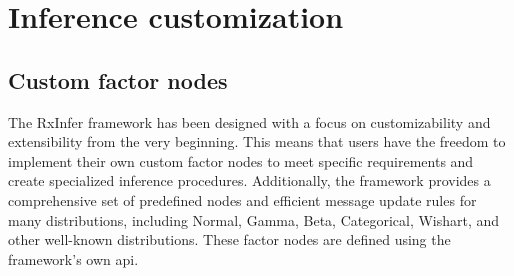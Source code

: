 
\section{Inference customization}\label{chapter-04:section:inference-customization}

\subsection{Custom factor nodes}

The RxInfer framework has been designed with a focus on customizability and extensibility from
the very beginning.
This means that users have the freedom to implement their own custom factor nodes to meet
specific requirements and create specialized inference procedures.
Additionally, the framework provides a comprehensive set of predefined nodes and efficient
message update rules for many distributions, including Normal, Gamma, Beta, Categorical,
Wishart, and other well-known distributions.
These factor nodes are defined using the framework's own \ac{api}.


